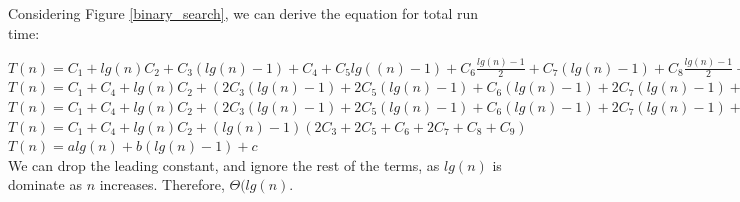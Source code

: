 \documentclass[11pt,letterpaper]{article}
\begin{document}
Considering Figure \ref{binary_search}, we can derive the equation for total run time:

$
T(n) = C_1 + lg(n)C_2 + C_3(lg(n) - 1) + C_4 + C_5lg((n) - 1) + C_6\frac{lg(n) - 1}{2} + C_7(lg(n) - 1) + C_8\frac{lg(n) - 1}{2} + C_9\frac{lg(n) - 1}{2}
$\\

$
T(n) = C_1 + C_4 + lg(n)C_2 + ( 2C_3(lg(n) - 1) +  2C_5(lg(n) - 1) + C_6(lg(n) - 1) + 2C_7(lg(n) - 1) + C_8(lg(n) - 1) + C_9(lg(n) - 1) )
$\\

$
T(n) = C_1 + C_4 + lg(n)C_2 + ( 2C_3(lg(n) - 1) +  2C_5(lg(n) - 1) + C_6(lg(n) - 1) + 2C_7(lg(n) - 1) + C_8(lg(n) - 1) + C_9(lg(n) - 1) )
$\\

$
T(n) = C_1 + C_4 + lg(n)C_2 + (lg(n) - 1)( 2C_3 +  2C_5 + C_6 + 2C_7 + C_8 + C_9 )
$\\

$
T(n) = a lg(n) + b(lg(n) - 1) + c
$\\

We can drop the leading constant, and ignore the rest of the terms, as $ lg(n) $ is dominate as $n$ increases.
Therefore, $ \Theta(lg(n) $.
\end{document}
